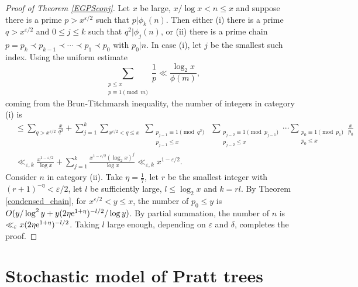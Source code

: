 \documentclass[12pt]{amsart}
\theoremstyle{remark}
\theoremstyle{plain}
\numberwithin{equation}{section}
\newcommand{\eps}{\ensuremath{\varepsilon}}
\renewcommand{\(}{\left(}
\renewcommand{\)}{\right)}
\newcommand{\er}{{\rm e}}  %
\renewcommand{\le}{\leqslant}
\begin{document}
\begin{proof}[Proof of Theorem \ref{EGPSconj}]
Let $x$ be large, $x/\log x<n\le x$ and suppose there is a prime $p>x^{\eps/2}$
such that $p|\phi_k(n)$.  Then either (i) there is a prime $q>x^{\eps/2}$
and $0\le j\le k$ such that $q^2|\phi_j(n)$, or (ii) there is a
prime chain $p=p_k \prec p_{k-1} \prec \cdots \prec p_1 \prec p_0$ with $p_0|n$.
In case (i), let $j$ be the smallest such index.
Using the uniform estimate 
\[
\sum_{\substack{p\le x \\ p\equiv 1\!\!\!\pmod{m}}} \frac{1}{p} \ll \frac{\log_2 x}
{\phi(m)},
\]
coming from the Brun-Titchmarsh inequality, the number of integers
in category (i) is
\begin{align*}
&\le \sum_{q>x^{\eps/2}} \frac{x}{q^2} + 
  \sum_{j=1}^k \sum_{x^{\eps/2} < q\le x} \; 
\sum_{\substack{p_{j-1}\equiv 1\!\!\!\!
  \pmod{q^2} \\ p_{j-1}\le x}} \;
  \sum_{\substack{p_{j-2}\equiv 1\!\!\!\!\pmod{p_{j-1}} \\ p_{j-2}\le x}} 
  \cdots \sum_{\substack{p_0\equiv 1\!\!\!\!\pmod{p_1} \\ p_0\le x}}
  \frac{x}{p_0} \\
&\ll_{\eps,k} \frac{x^{1-\eps/2}}{\log x} + \sum_{j=1}^k 
  \frac{x^{1-\eps/2}(\log_2 x)^j}{\log x} \ll_{\eps,k} x^{1-\eps/2}.
\end{align*}
Consider $n$ in category (ii).  Take
$\eta=\frac17$, let $r$ be the smallest integer with $(r+1)^{-\eta}<\eps/2$,
let $l$ be sufficiently large, $l\le \log_2 x$ and $k=rl$.  By Theorem \ref{condensed_chain},
for $x^{\eps/2}<y\le x$, the number of $p_0\le y$ is
$O(y/\log^2 y + y (2\eta \er^{1+\eta})^{-l/2}/\log y)$.  By partial summation,
the number of $n$ is $\ll_\eps x (2\eta \er^{1+\eta})^{-l/2}$.  Taking
$l$ large enough, depending on $\eps$ and $\delta$, completes the proof.
\end{proof}



%
%
%
%
\section{Stochastic model of Pratt trees}\label{sec:model}
%
%
%
%
\end{document}
